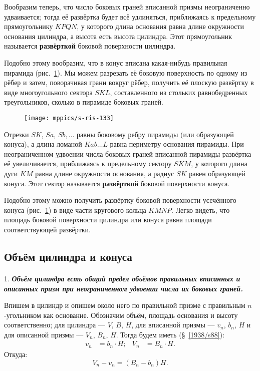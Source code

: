 Вообразим теперь, что число боковых граней вписанной призмы неограниченно удваивается;
тогда её развёртка будет всё удлиняться, приближаясь к предельному прямоугольнику $KPQN$, у которого длина основания равна длине окружности основания цилиндра, а высота есть высота цилиндра.
Этот прямоугольник называется \textbf{развёрткой} боковой поверхности цилиндра.

Подобно этому вообразим, что в конус вписана какая-нибудь правильная пирамида (рис.~\ref{1938/s-ris-133}).
Мы можем разрезать её боковую поверхность по одному из рёбер и затем, поворачивая грани вокруг рёбер, получить её плоскую развёртку в виде многоугольного сектора $SKL$, составленного из стольких равнобедренных треугольников, сколько в пирамиде боковых граней.
\begin{figure}[h!]
\vskip-0mm
\centering
\texttt{[image: mppics/s-ris-133]}
\caption{}\label{1938/s-ris-133}
\vskip-0mm
\end{figure}
Отрезки $SK$, $Sa$, $Sb,\dots$ равны боковому ребру пирамиды (или образующей конуса), а длина ломаной $Kab\dots L$ равна периметру основания пирамиды.
При неограниченном удвоении числа боковых граней вписанной пирамиды развёртка её увеличивается, приближаясь к предельному сектору $SKM$, у которого длина дуги $KM$ равна длине окружности основания, а радиус $SK$ равен образующей конуса.
Этот сектор называется \textbf{развёрткой} боковой поверхности конуса.

Подобно этому можно получить развёртку боковой поверхности усечённого конуса (рис.~\ref{1938/s-ris-133}) в виде части кругового кольца $KMNP$.
Легко видеть, что площадь боковой поверхности цилиндра или конуса равна площади соответствующей развёртки.



\subsection*{Объём цилиндра и конуса}

\paragraph{}\label{1914/470}  1. 
\textbf{\emph{Объём цилиндра есть общий предел объёмов правильных вписанных и описанных призм при неограниченном удвоении числа их боковых граней.}}


Впишем в цилиндр и опишем около него по правильной призме с правильным $n$-угольником как основание.
Обозначим объём, площадь основания и высоту соответственно; 
для цилиндра — $V$, $B$, $H$, 
для вписанной призмы — $v_n$, $b_n$, $H$ 
и для описанной призмы — $V_n$, $B_n$, $H$.
Тогда будем иметь (§~\ref{1938/s88}): 
\begin{align*}
v_n&=b_n\cdot H;
&
V_n&=B_n\cdot H.
\end{align*}
Откуда:
\[V_n-v_n=(B_n-b_n)H.\]

